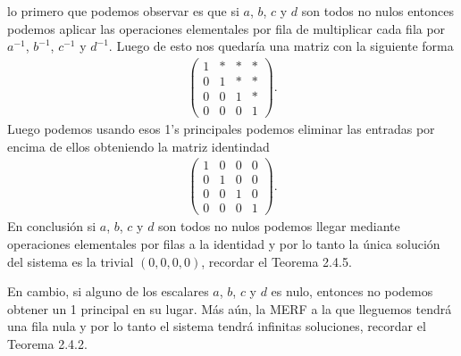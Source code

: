 \begin{enumerate}[topsep=6pt, itemsep=.4cm]
\rta lo primero que podemos observar es que si $a$, $b$, $c$ y $d$ son todos no nulos entonces podemos aplicar las operaciones elementales por fila de multiplicar cada fila por $a^{-1}$, $b^{-1}$, $c^{-1}$ y $d^{-1}$. Luego de esto nos quedaría una matriz con la siguiente forma
\begin{align*}
\left(
\begin{array}{cccc}
1 & * & * & *\\
0 & 1 & * & *\\
0 & 0 & 1 & *\\
0 & 0 & 0 & 1
\end{array}
\right).
\end{align*}
Luego podemos usando esos 1's principales podemos eliminar las entradas por encima de ellos obteniendo la matriz identindad
\begin{align*}
\left(
\begin{array}{cccc}
1 & 0 & 0 & 0\\
0 & 1 & 0 & 0\\
0 & 0 & 1 & 0\\
0 & 0 & 0 & 1
\end{array}
\right).
\end{align*}
En conclusión si $a$, $b$, $c$ y $d$ son todos no nulos podemos llegar mediante operaciones elementales por filas a la identidad y por lo tanto la única solución del sistema es la trivial $(0,0,0,0)$, recordar el Teorema 2.4.5.

En cambio, si alguno de los escalares $a$, $b$, $c$ y $d$ es nulo, entonces no podemos obtener un 1 principal en su lugar. Más aún, la MERF a la que lleguemos tendrá una fila nula y por lo tanto el sistema tendrá infinitas soluciones, recordar el Teorema 2.4.2. 


\end{enumerate}
